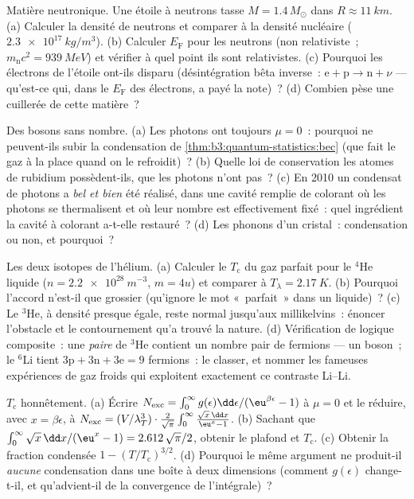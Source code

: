 \begin{exercise}[$\star\star$]\label{exo:b3:quantum-statistics:7}
Matière neutronique. Une étoile à neutrons tasse $M = 1.4\,M_\odot$ dans $R
\approx \qty{11}{km}$. (a) Calculer la densité de neutrons et
comparer à la densité nucléaire ($\qty{2.3e17}{kg/m^3}$). (b)
Calculer $E_{\text{F}}$ pour les neutrons (non relativiste~; $m_{\text{n}}c^2
= \qty{939}{MeV}$) et vérifier à quel point ils sont relativistes.
(c) Pourquoi les électrons de l'étoile ont-ils disparu
(désintégration bêta inverse~: $\text{e} + \text{p} \to \text{n} + \nu$
--- qu'est-ce qui, dans le $E_{\text{F}}$ des électrons, a payé la
note)~? (d) Combien pèse une cuillerée de cette matière~?
\end{exercise}

\begin{exercise}[$\star\star$]\label{exo:b3:quantum-statistics:8}
Des bosons sans nombre. (a) Les photons ont toujours $\mu = 0$~:
pourquoi ne peuvent-ils subir la condensation de
\cref{thm:b3:quantum-statistics:bec} (que fait le gaz à la place
quand on le refroidit)~? (b) Quelle loi de conservation les atomes de
rubidium possèdent-ils, que les photons n'ont pas~? (c) En 2010 un
condensat de photons a \emph{bel et bien} été réalisé, dans une
cavité remplie de colorant où les photons se thermalisent et où leur
nombre est effectivement fixé~: quel ingrédient la cavité à colorant
a-t-elle restauré~? (d) Les phonons d'un cristal~: condensation ou
non, et pourquoi~?
\end{exercise}

\begin{exercise}[$\star\star$]\label{exo:b3:quantum-statistics:9}
Les deux isotopes de l'hélium. (a) Calculer le $T_{\text{c}}$ du gaz
parfait pour le $^4$He liquide ($n = \qty{2.2e28}{m^{-3}}$, $m = 4u$)
et comparer à $T_\lambda = \qty{2.17}{K}$. (b) Pourquoi l'accord
n'est-il que grossier (qu'ignore le mot «~parfait~» dans un
liquide)~? (c) Le $^3$He, à densité presque égale, reste normal
jusqu'aux millikelvins~: énoncer l'obstacle et le contournement
qu'a trouvé la nature. (d) Vérification de logique composite~: une \emph{paire} de $^3$He contient un nombre
pair de fermions --- un boson~; le $^6$Li tient $3\text{p} + 3\text{n}
+ 3\text{e} = 9$ fermions~: le classer, et nommer les fameuses
expériences de gaz froids qui exploitent exactement ce contraste
Li--Li.
\end{exercise}

\begin{exercise}[$\star\star\star$]\label{exo:b3:quantum-statistics:10}
$T_{\text{c}}$ honnêtement. (a) Écrire $N_{\text{exc}} = \int_0^\infty
g(\epsilon)\dd\epsilon/(\eu^{\beta\epsilon} - 1)$ à $\mu = 0$ et
le réduire, avec $x = \beta\epsilon$, à $N_{\text{exc}} =
(V/\lambda_T^3)\cdot\frac{2}{\sqrt\pi}\int_0^\infty\frac{\sqrt
x\,\dd x}{\eu^x - 1}$. (b) Sachant que $\int_0^\infty\sqrt x\,\dd x/(
\eu^x - 1) = 2.612\,\sqrt\pi/2$, obtenir le plafond et
$T_{\text{c}}$. (c) Obtenir la fraction condensée $1 -
(T/T_{\text{c}})^{3/2}$. (d) Pourquoi le même argument ne produit-il
\emph{aucune} condensation dans une boîte à deux dimensions (comment
$g(
\epsilon)$ change-t-il, et qu'advient-il de la convergence de
l'intégrale)~?
\end{exercise}

